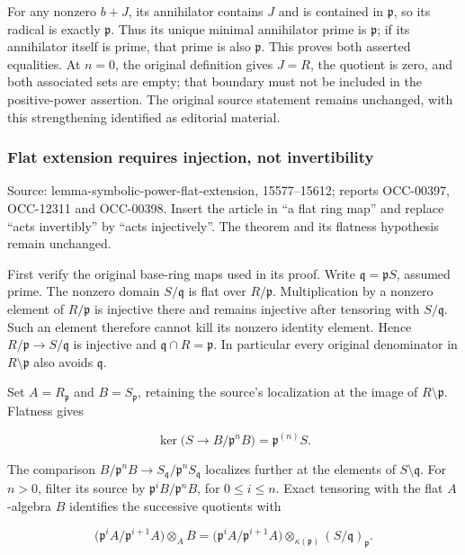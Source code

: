 For any nonzero \(b+J\), its annihilator contains \(J\) and is contained in \(\mathfrak p\), so its radical is exactly \(\mathfrak p\). Thus its unique minimal annihilator prime is \(\mathfrak p\); if its annihilator itself is prime, that prime is also \(\mathfrak p\). This proves both asserted equalities. At \(n=0\), the original definition gives \(J=R\), the quotient is zero, and both associated sets are empty; that boundary must not be included in the positive-power assertion. The original source statement remains unchanged, with this strengthening identified as editorial material.

\subsubsection{Flat extension requires injection, not invertibility}\label{flat-extension-requires-injection-not-invertibility}

Source: lemma-symbolic-power-flat-extension, 15577--15612; reports OCC-00397, OCC-12311 and OCC-00398. Insert the article in ``a flat ring map'' and replace ``acts invertibly'' by ``acts injectively''. The theorem and its flatness hypothesis remain unchanged.

First verify the original base-ring maps used in its proof. Write \(\mathfrak q=\mathfrak pS\), assumed prime. The nonzero domain \(S/\mathfrak q\) is flat over \(R/\mathfrak p\). Multiplication by a nonzero element of \(R/\mathfrak p\) is injective there and remains injective after tensoring with \(S/\mathfrak q\). Such an element therefore cannot kill its nonzero identity element. Hence \(R/\mathfrak p\to S/\mathfrak q\) is injective and \(\mathfrak q\cap R=\mathfrak p\). In particular every original denominator in \(R\setminus\mathfrak p\) also avoids \(\mathfrak q\).

Set \(A=R_{\mathfrak p}\) and \(B=S_{\mathfrak p}\), retaining the source's localization at the image of \(R\setminus\mathfrak p\). Flatness gives

\[
\ker\bigl(S\to B/\mathfrak p^nB\bigr)=\mathfrak p^{(n)}S.
\]

The comparison \(B/\mathfrak p^nB\to S_{\mathfrak q}/\mathfrak p^nS_{\mathfrak q}\) localizes further at the elements of \(S\setminus\mathfrak q\). For \(n>0\), filter its source by \(\mathfrak p^iB/\mathfrak p^nB\), for \(0\leq i\leq n\). Exact tensoring with the flat \(A\)-algebra \(B\) identifies the successive quotients with

\[
\bigl(\mathfrak p^iA/\mathfrak p^{i+1}A\bigr)\otimes_A B
=\bigl(\mathfrak p^iA/\mathfrak p^{i+1}A\bigr)
 \otimes_{\kappa(\mathfrak p)}(S/\mathfrak q)_{\mathfrak p}.
\]


